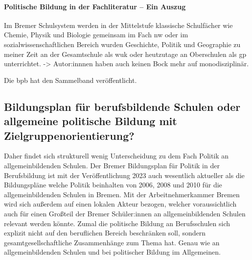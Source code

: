 \paragraph{Politische Bildung in der Fachliteratur -- Ein Auszug}
Im Bremer Schulsystem werden in der Mittelstufe klassische Schulfächer wie Chemie, Physik und Biologie gemeinsam im Fach \gls{nw} \autocite{vogel2010nw} oder im sozialwissenschaftlichen Bereich wurden Geschichte, Politik und Geographie zu meiner Zeit an der Gesamtschule als \gls{wuk} \autocite{vogel2006gs} oder heutzutage an Oberschulen als \gls{gp} \autocite{vogel2010gp} unterrichtet.
->
Autor:innnen haben auch keinen Bock mehr auf monodisziplinär. 

Die \gls{bpb} hat den Sammelband veröffentlicht.

\subsection{Bildungsplan für berufsbildende Schulen oder allgemeine politische Bildung mit Zielgruppenorientierung?}
Daher findet sich strukturell wenig Unterscheidung zu dem Fach Politik an allgemeinbildenden Schulen.
Der Bremer Bildungsplan für Politik in der Berufsbildung ist mit der Veröffentlichung 2023 auch wesentlich aktueller als die Bildungspläne welche Politik beinhalten von 2006, 2008 und 2010 für die allgemeinbildenden Schulen in Bremen. 
Mit der Arbeitnehmerkammer Bremen wird sich außerdem auf einen lokalen Akteur bezogen, welcher voraussichtlich auch für einen Großteil der Bremer Schüler:innen an allgemeinbildenden Schulen relevant werden könnte. 
Zumal die politische Bildung an Berufsschulen sich explizit nicht auf den beruflichen Bereich beschränken soll, sondern gesamtgesellschaftliche Zusammenhänge zum Thema hat. Genau wie an allgemeinbildenden Schulen und bei politischer Bildung im Allgemeinen.


